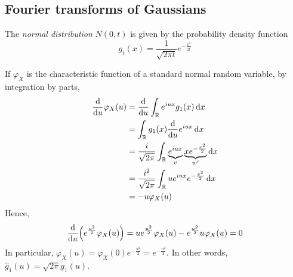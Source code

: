 \subsection{Fourier transforms of Gaussians}
\begin{definition}
	The \emph{normal distribution} \( N(0,t) \) is given by the probability density function
	\[ g_t(x) = \frac{1}{\sqrt{2\pi t}} e^{-\frac{x^2}{2t}} \]
\end{definition}
If \( \varphi_X \) is the characteristic function of a standard normal random variable, by integration by parts,
\begin{align*}
	\dv{u} \varphi_X(u) &= \dv{u} \int_{\mathbb R} e^{iux} g_1(x) \dd{x} \\
	&= \int_{\mathbb R} g_1(x) \dv{u} e^{iux} \dd{x} \\
	&= \frac{i}{\sqrt{2\pi}} \int_{\mathbb R} \underbrace{e^{iux}}_{v} \underbrace{x e^{-\frac{x^2}{2}}}_{w'} \dd{x} \\
	&= \frac{i^2}{\sqrt{2\pi}} \int_{\mathbb R} u e^{iux} e^{-\frac{x^2}{2}} \dd{x} \\
	&= -u \varphi_X(u)
\end{align*}
Hence,
\[ \dv{u}\qty(e^{\frac{u^2}{2}} \varphi_X(u)) = ue^{\frac{u^2}{2}} \varphi_X(u) - e^{\frac{u^2}{2}} u \varphi_X(u) = 0 \]
In particular, \( \varphi_X(u) = \varphi_X(0) e^{-\frac{u^2}{2}} = e^{-\frac{u^2}{2}} \).
In other words, \( \hat g_1(u) = \sqrt{2\pi} g_1(u) \).

